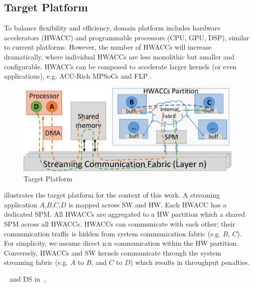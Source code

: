 \subsection{Target Platform}
\label{sec:Platform}

To balance flexibility and efficiency, domain platform includes hardware accelerators (HWACC) and programmable processors (CPU, GPU, DSP), similar to current platforms. However, the number of HWACCs will increase dramatically, where individual HWACCs are less monolithic but smaller and configurable. HWACCs can be composed to accelerate larger kernels (or even applications), e.g. ACC-Rich MPSoCs \cite{cong2014accelerator} and FLP \cite{tabkhi2014function}. 

\begin{figure}[h]
	\centering
	\includegraphics[width=.65\linewidth]{fig/pPlat.pdf}
	\caption{Target Platform}
	\label{fig:plat}
\end{figure}

 illustrates the target platform for the context of this work. A streaming application $A$,$B$,$C$,$D$ is mapped across SW and HW. Each HWACC has a dedicated SPM. All HWACCs are aggregated to a HW partition which a shared SPM across all HWACCs. HWACCs can communicate with each other; their communication traffic is hidden from system communication fabric (e.g. $B$, $C$). For simplicity, we assume direct n:n communication within the HW partition. Conversely, HWACCs and SW kernels communicate through the system streaming fabric (e.g. $A$ to $B$, and $C$ to $D$) which results in throughput penalties.



~ and DS in~, 